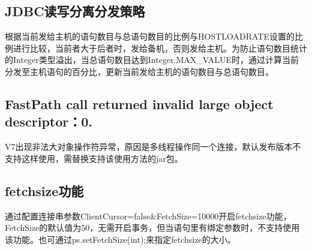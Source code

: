 \documentclass[letterpaper,10pt,english]{sphinxmanual}
\begin{document}
\begin{sphinxVerbatim}[commandchars=\\\{\}]
\PYG{p}{[} \PYG{p}{]} \PYG{p}{[}\PYG{p}{]} \PYG{p}{[}\PYG{p}{]}      \PYG{p}{[} \PYG{p}{]}         
\end{sphinxVerbatim}


\subsection{JDBC读写分离分发策略}
\label{\detokenize{interface/jdbc-v7:id2}}
根据当前发给主机的语句数目与总语句数目的比例与HOSTLOADRATE设置的比例进行比较，当前者大于后者时，发给备机，否则发给主机。为防止语句数目统计的Integer类型溢出，当总语句数目达到Integer.MAX\_VALUE时，通过计算当前分发至主机语句的百分比，更新当前发给主机的语句数目与总语句数目。


\subsection{FastPath call returned invalid large object descriptor：0.}
\label{\detokenize{interface/jdbc-v7:fastpath-call-returned-invalid-large-object-descriptor-0}}
V7出现非法大对象操作符异常，原因是多线程操作同一个连接，默认发布版本不支持这样使用，需替换支持该使用方法的jar包。


\subsection{fetchsize功能}
\label{\detokenize{interface/jdbc-v7:fetchsize}}
通过配置连接串参数ClientCursor=false\&FetchSize=10000开启fetchsize功能，FetchSize的默认值为50，无需开启事务，但当语句里有绑定参数时，不支持使用该功能。也可通过ps.setFetchSize(int);来指定fetchsize的大小。
\end{document}
